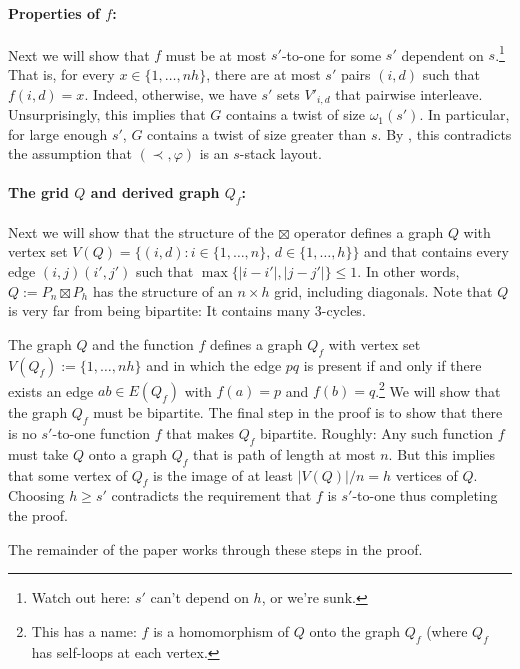 \documentclass[kpfonts]{patmorin}
\begin{document}
\paragraph{Properties of $f$:}

Next we will show that $f$ must be at most $s'$-to-one for some $s'$ dependent on $s$.\footnote{Watch out here: $s'$ can't depend on $h$, or we're sunk.}  That is, for every $x\in\{1,\ldots,nh\}$, there are at most $s'$ pairs $(i,d)$ such that $f(i,d)=x$.  Indeed, otherwise, we have $s'$ sets $V'_{i,d}$ that pairwise interleave.  Unsurprisingly, this implies that $G$ contains a twist of size $\omega_1(s')$.  In particular, for large enough $s'$, $G$ contains a twist of size greater than $s$. By , this contradicts the assumption that $(\prec,\varphi)$ is an $s$-stack layout.

\paragraph{The grid $Q$ and derived graph $Q_f$:}
Next we will show that the structure of the $\boxtimes$ operator defines a graph $Q$ with vertex set $V(Q)=\{(i,d):i\in\{1,\ldots,n\},\, d\in\{1,\ldots,h\}\}$ and that contains every edge $(i,j)(i',j')$ such that $\max\{|i-i'|,|j-j'|\}\le 1$. In other words, $Q:=P_n\boxtimes P_h$ has the structure of an $n\times h$ grid, including diagonals. Note that $Q$ is very far from being bipartite: It contains many 3-cycles.

The graph $Q$ and the function $f$ defines a graph $Q_f$ with vertex set $V(Q_f):=\{1,\ldots,nh\}$ and in which the edge $pq$ is present if and only if there exists an edge $ab\in E(Q_f)$ with $f(a)=p$ and $f(b)=q$.\footnote{This has a name: $f$ is a homomorphism of $Q$ onto the graph $Q_f$ (where $Q_f$ has self-loops at each vertex.}  We will show that the graph $Q_f$ must be bipartite.  The final step in the proof is to show that there is no $s'$-to-one function $f$ that makes $Q_f$ bipartite.  Roughly:  Any such function $f$ must take $Q$ onto a graph $Q_f$ that is path of length at most $n$.  But this implies that some vertex of $Q_f$ is the image of at least $|V(Q)|/n=h$ vertices of $Q$. Choosing $h\ge s'$ contradicts the requirement that $f$ is $s'$-to-one thus completing the proof.
% 
% 

The remainder of the paper works through these steps in the proof.
\end{document}
